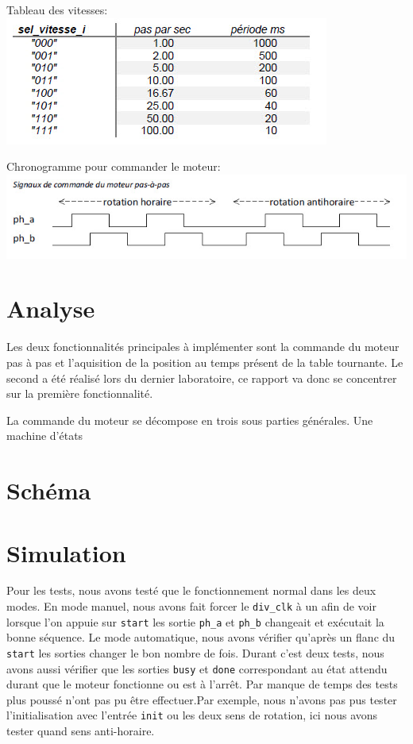 \documentclass[10pt,a4paper]{article}
\begin{document}
Tableau des vitesses:\\
\includegraphics[scale=0.5]{images/vitesse.jpg}

Chronogramme pour commander le moteur:\\
\includegraphics[scale=0.5]{images/cmd_moteur.jpg}
\newpage
\section{Analyse}
Les deux fonctionnalités principales à implémenter sont la commande du moteur pas à pas et l'aquisition de la position au temps présent de la table tournante.
Le second a été réalisé lors du dernier laboratoire, ce rapport va donc se concentrer sur la première fonctionnalité.

La commande du moteur se décompose en trois sous parties générales.
Une machine d'états 
\newpage
\section{Schéma}

\newpage
\section{Simulation}
Pour les tests, nous avons testé que le fonctionnement normal dans les deux modes. En mode manuel, nous avons fait forcer le \texttt{div\_clk} à un afin de voir lorsque l'on appuie sur \texttt{start} les sortie \texttt{ph\_a} et \texttt{ph\_b} changeait et exécutait la bonne séquence. Le mode automatique, nous avons vérifier qu'après un flanc du \texttt{start} les sorties changer le bon nombre de fois. Durant c'est deux tests, nous avons aussi vérifier que les sorties \texttt{busy} et \texttt{done} correspondant au état attendu durant que le moteur fonctionne ou est à l'arrêt. Par manque de temps des tests plus poussé n'ont pas pu être effectuer.Par exemple, nous n'avons pas pus tester l'initialisation avec l'entrée \texttt{init} ou les deux sens de rotation, ici nous avons tester quand sens anti-horaire.\\
\end{document}
